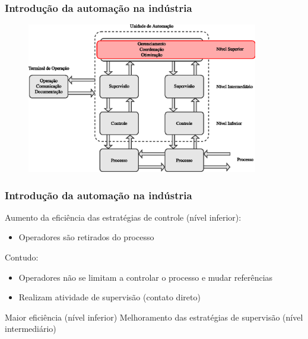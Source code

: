 \documentclass{beamer}
\begin{document}
\begin{frame}
    \frametitle{Introdução da automação na indústria}

\begin{figure}[htb]
\centering
    \includegraphics[width=0.9\textwidth]
    {imgs/introducao/eps/esquema_automacao_sup}
\end{figure}
\end{frame}

\begin{frame}
    \frametitle{Introdução da automação na indústria}

    Aumento da eficiência das estratégias de controle (nível inferior):

\begin{itemize}
    \item Operadores são retirados do processo
\end{itemize}
   
    Contudo:

\begin{itemize}
    \item Operadores não se limitam a controlar o processo e mudar referências
    \item Realizam atividade de supervisão (contato direto)
\end{itemize} 

    Maior eficiência (nível inferior) \implica Melhoramento das estratégias de
    supervisão (nível intermediário)

\end{frame}

\end{document}
